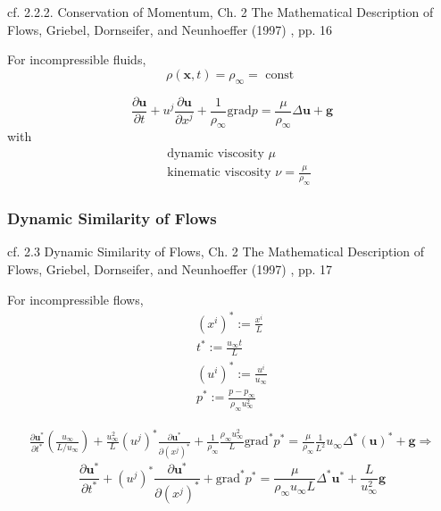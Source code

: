 \documentclass[10pt]{amsart}
\begin{document}
\begin{multicols*}{2}
cf. 2.2.2. Conservation of Momentum, Ch. 2 The Mathematical Description of Flows, Griebel, Dornseifer, and Neunhoeffer (1997) \cite{GDN1997}, pp. 16

For incompressible fluids,
\[
\rho(\mathbf{x},t) = \rho_{\infty} = \text{ const }
\]

\begin{equation}
  \frac{ \partial \mathbf{u}}{ \partial t} + u^j \frac{ \partial \mathbf{u} }{ \partial x^j} + \frac{1}{\rho_{\infty}} \text{grad}p = \frac{ \mu}{ \rho_{\infty} } \Delta \mathbf{u} + \mathbf{g}
  \end{equation}
with
\[
\begin{aligned}
  & \text{ dynamic viscosity $\mu$ } \\
  & \text{ kinematic viscosity } \nu = \frac{ \mu }{ \rho_{\infty}} \end{aligned}
\]

\subsubsection{Dynamic Similarity of Flows}

cf. 2.3 Dynamic Similarity of Flows, Ch. 2 The Mathematical Description of Flows, Griebel, Dornseifer, and Neunhoeffer (1997) \cite{GDN1997}, pp. 17

For incompressible flows,
\begin{equation}
  \begin{aligned}
    (x^i)^* := \frac{ x^i}{L}   \\
    t^* := \frac{u_{\infty} t}{L} \\
    (u^i)^* := \frac{u^i}{ u_{\infty} } \\
    p^* := \frac{ p - p_{\infty} }{ \rho_{\infty} u^2_{\infty} }
    \end{aligned}
  \end{equation}

\[
\begin{gathered}
  \frac{ \partial \mathbf{u}^*}{ \partial t^*} \left( \frac{u_{\infty} }{ L/u_{\infty} } \right) + \frac{u_{\infty}^2 }{L} (u^j)^* \frac{ \partial \mathbf{u}^* }{ \partial (x^j)^*} + \frac{1}{\rho_{\infty}} \frac{ \rho_{\infty} u_{\infty}^2 }{ L} \text{grad}^*p^* = \frac{ \mu}{ \rho_{\infty} } \frac{1}{L^2} u_{\infty} \Delta^* ( \mathbf{u})^* + \mathbf{g} \Longrightarrow
  \end{gathered}
\]
\begin{equation}\label{Eq:momconsvincompresssimilar}
\frac{ \partial \mathbf{u}^*}{ \partial t^*} + (u^j)^* \frac{ \partial \mathbf{u}^* }{ \partial (x^j)^* } + \text{grad}^* p^* = \frac{ \mu}{ \rho_{\infty} u_{\infty} L} \Delta^* \mathbf{u}^* + \frac{L}{u^2_{\infty} } \mathbf{g}
  \end{equation}


\end{multicols*}
\end{document}
